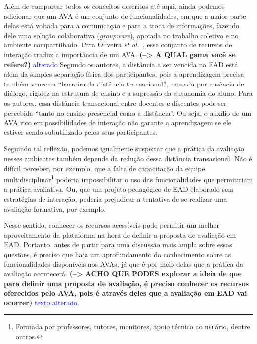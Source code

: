Além de comportar todos os conceitos descritos até aqui, ainda podemos adicionar que um AVA é um conjunto de funcionalidades, em que a maior parte delas está  voltada para a comunicação e para a troca de informações, fazendo dele uma solução colaborativa (\textit{groupware}), apoiada no trabalho coletivo e no ambiente compartilhado. Para Oliveira \textit{et al.}~\cite{dotta@ead}, esse conjunto de recursos de interação traduz a importância de um AVA. \textbf{(--> A QUAL gama você se refere?) } \textcolor{blue}{alterado} Segundo os autores, a distância a ser vencida na EAD está além da simples separação física dos participantes, pois a aprendizagem precisa também vencer a ``barreira da distância transacional'', causada por ausência de diálogo, rigidez na estrutura de ensino e a supressão da autonomia do aluno. Para os autores, essa distância transacional entre docentes e discentes pode ser percebida ``tanto no ensino presencial como a distância''. Ou seja, o auxílio de um AVA rico em possibilidades de interação não garante a aprendizagem se ele estiver sendo subutilizado pelos seus participantes.

Seguindo tal reflexão, podemos igualmente suspeitar que a prática da avaliação nesses ambientes também depende da redução dessa distância transacional. Não é difícil perceber, por exemplo, que a falta de capacitação da equipe multidisciplinar\footnote{Formada por professores, tutores, monitores, apoio técnico ao usuário, dentre outros.} poderia impossibilitar o uso das funcionalidades que permitiriam a prática avaliativa. Ou, que um projeto pedagógico de EAD elaborado sem estratégias de interação, poderia prejudicar a tentativa de se realizar uma avaliação formativa, por exemplo.

Nesse sentido, conhecer os recursos acessíveis pode permitir um melhor aproveitamento da plataforma na hora de definir a proposta de avaliação em EAD. Portanto, antes de partir para uma discussão mais ampla sobre essas questões, é preciso que haja um aprofundamento do conhecimento sobre as funcionalidades disponíveis nos AVAs, já que é por meio delas que a prática da avaliação acontecerá. \textbf{(--> ACHO QUE PODES explorar a ideia de que para definir uma proposta de avaliação, é preciso conhecer os recursos oferecidos pelo AVA, pois é através deles que a avaliação em EAD vai ocorrer)} \textcolor{blue}{texto alterado.}


